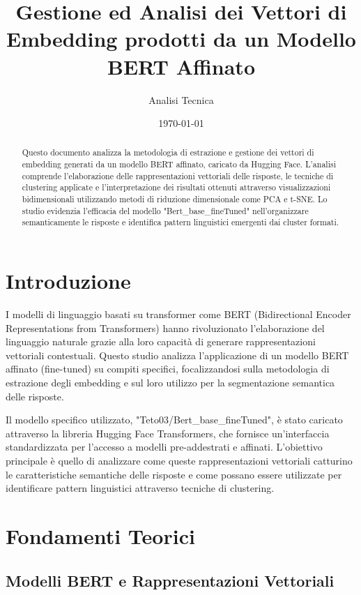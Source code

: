 \documentclass{article}
\title{Gestione ed Analisi dei Vettori di Embedding prodotti da un Modello BERT Affinato}
\author{Analisi Tecnica}
\date{\today}
\begin{document}
\maketitle

\begin{abstract}
Questo documento analizza la metodologia di estrazione e gestione dei vettori di embedding generati da un modello BERT affinato, caricato da Hugging Face. L'analisi comprende l'elaborazione delle rappresentazioni vettoriali delle risposte, le tecniche di clustering applicate e l'interpretazione dei risultati ottenuti attraverso visualizzazioni bidimensionali utilizzando metodi di riduzione dimensionale come PCA e t-SNE. Lo studio evidenzia l'efficacia del modello "Bert\_base\_fineTuned" nell'organizzare semanticamente le risposte e identifica pattern linguistici emergenti dai cluster formati.
\end{abstract}

\tableofcontents

\newpage

\section{Introduzione}

I modelli di linguaggio basati su transformer come BERT (Bidirectional Encoder Representations from Transformers) hanno rivoluzionato l'elaborazione del linguaggio naturale grazie alla loro capacità di generare rappresentazioni vettoriali contestuali. Questo studio analizza l'applicazione di un modello BERT affinato (fine-tuned) su compiti specifici, focalizzandosi sulla metodologia di estrazione degli embedding e sul loro utilizzo per la segmentazione semantica delle risposte.

Il modello specifico utilizzato, "Teto03/Bert\_base\_fineTuned", è stato caricato attraverso la libreria Hugging Face Transformers, che fornisce un'interfaccia standardizzata per l'accesso a modelli pre-addestrati e affinati. L'obiettivo principale è quello di analizzare come queste rappresentazioni vettoriali catturino le caratteristiche semantiche delle risposte e come possano essere utilizzate per identificare pattern linguistici attraverso tecniche di clustering.

\section{Fondamenti Teorici}

\subsection{Modelli BERT e Rappresentazioni Vettoriali}
\end{document}
